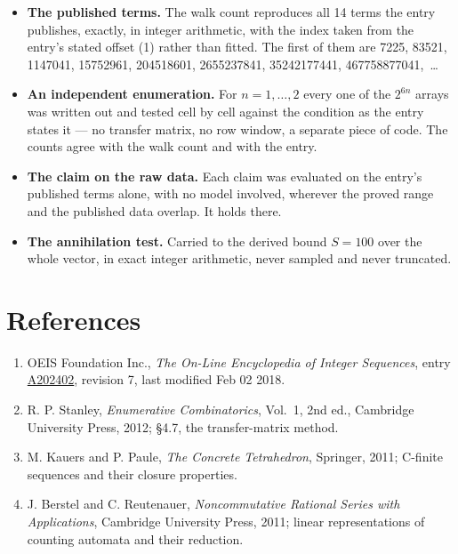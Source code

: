 \documentclass[11pt]{article}
\theoremstyle{definition}
\begin{document}
\begin{itemize}

\item {\bfseries The published terms.} The walk count reproduces all 14 terms the entry publishes, exactly, in integer arithmetic, with the index taken from the entry's stated offset (1) rather than fitted. The first of them are 7225, 83521, 1147041, 15752961, 204518601, 2655237841, 35242177441, 467758877041,~\dots

\item {\bfseries An independent enumeration.} For $n = 1,\dots,2$ every one of the $2^{6n}$ arrays was written out and tested cell by cell against the condition as the entry states it --- no transfer matrix, no row window, a separate piece of code. The counts agree with the walk count and with the entry.

\item {\bfseries The claim on the raw data.} Each claim was evaluated on the entry's published terms alone, with no model involved, wherever the proved range and the published data overlap. It holds there.

\item {\bfseries The annihilation test.} Carried to the derived bound $S = 100$ over the whole vector, in exact integer arithmetic, never sampled and never truncated.

\end{itemize}

\section{References}

\begin{enumerate}

\item OEIS Foundation Inc., \emph{The On-Line Encyclopedia of Integer Sequences}, entry \href{https://oeis.org/A202402}{A202402}, revision 7, last modified Feb 02 2018.

\item R. P. Stanley, \emph{Enumerative Combinatorics}, Vol.~1, 2nd ed., Cambridge University Press, 2012; \S4.7, the transfer-matrix method.

\item M. Kauers and P. Paule, \emph{The Concrete Tetrahedron}, Springer, 2011; C-finite sequences and their closure properties.

\item J. Berstel and C. Reutenauer, \emph{Noncommutative Rational Series with Applications}, Cambridge University Press, 2011; linear representations of counting automata and their reduction.

\end{enumerate}
\end{document}
